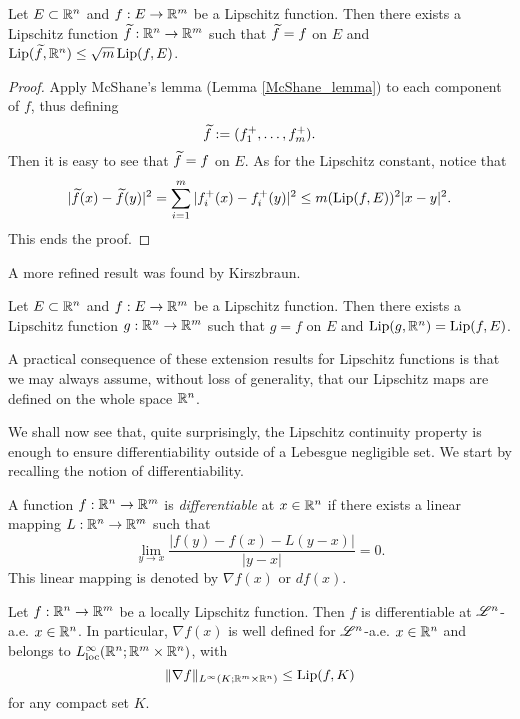 \begin{corollary}
Let $E \subset \mathbb{R}^{n}$ and $f: E \to \mathbb{R}^{m}$ be a Lipschitz function. Then there exists a Lipschitz function $\widetilde{ f} : \mathbb{R}^{n} \to \mathbb{R}^{m}$ such that $\widetilde{ f} = f$ on $E$ and $\operatorname{Lip}(\widetilde{ f}, \mathbb{R}^{n}) \le \sqrt{m} \operatorname{Lip}(f, E)$.
\end{corollary}
\begin{proof}
Apply McShane's lemma (Lemma \ref{McShane_lemma}) to each component of $f$, thus defining
\begin{equation*}
\widetilde{ f} := (f_{1}^{+}, \dots, f_{m}^{+}).
\end{equation*}
Then it is easy to see that $\widetilde{ f}= f$ on $E$. As for the Lipschitz constant, notice that
\begin{equation*}
|\widetilde{ f}(x) - \widetilde{ f}(y)|^{2} = \sum_{i = 1}^{m}|f_{i}^{+}(x) - f_{i}^{+}(y)|^{2} \le m (\operatorname{Lip}(f, E))^{2} |x - y|^2.
\end{equation*}
This ends the proof.
\end{proof}

A more refined result was found by Kirszbraun.

\begin{theorem}
Let $E \subset \mathbb{R}^{n}$ and $f: E \to \mathbb{R}^{m}$ be a Lipschitz function. Then there exists a Lipschitz function $g: \mathbb{R}^{n} \to \mathbb{R}^{m}$ such that $g = f$ on $E$ and $\operatorname{Lip}(g, \mathbb{R}^{n}) = \operatorname{Lip}(f, E)$.
\end{theorem}

A practical consequence of these extension results for Lipschitz functions is that we may always assume, without loss of generality, that our Lipschitz maps are defined on the whole space $\mathbb{R}^{n}$.

We shall now see that, quite surprisingly, the Lipschitz continuity property is enough to ensure differentiability outside of a Lebesgue negligible set. We start by recalling the notion of differentiability.

\begin{definition}
A function $f : \mathbb{R}^{n} \to \mathbb{R}^{m}$ is {\em differentiable} at $x \in \mathbb{R}^{n}$ if there exists a linear mapping $L: \mathbb{R}^{n} \to \mathbb{R}^{m}$ such that
\begin{equation*}
\lim_{y \to x} \frac{|f(y) - f(x) - L(y - x)|}{|y - x|} = 0.
\end{equation*}
This linear mapping is denoted by $\nabla f(x)$ or $d f(x)$.
\end{definition}

\begin{theorem}
Let $f : \mathbb{R}^{n} \to \mathbb{R}^{m}$ be a locally Lipschitz function. Then $f$ is differentiable at $\mathscr{L}^{n}$-a.e. $x \in \mathbb{R}^{n}$. In particular, $\nabla f(x)$ is well defined for $\mathscr{L}^{n}$-a.e. $x \in \mathbb{R}^{n}$ and belongs to $L^{\infty}_{\rm loc}(\mathbb{R}^{n}; \mathbb{R}^{m} \times \mathbb{R}^{n})$, with $$\|\nabla f\|_{L^{\infty}(K; \mathbb{R}^{m} \times \mathbb{R}^{n})} \le \operatorname{Lip}(f, K)$$ for any compact set $K$.
\end{theorem}

